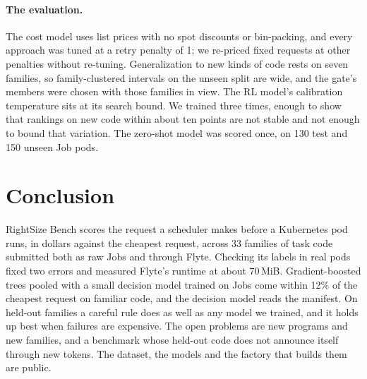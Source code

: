 \paragraph{The evaluation.}
The cost model uses list prices with no spot discounts or bin-packing, and every approach was tuned at a retry penalty
of 1; we re-priced fixed requests at other penalties without re-tuning. Generalization to new kinds of code rests on
seven families, so family-clustered intervals on the unseen split are wide, and the gate's members were chosen with
those families in view. The RL model's calibration temperature sits at its search bound. We trained three times,
enough to show that rankings on new code within about ten points are not stable and not enough to bound that
variation. The zero-shot model was scored once, on 130 test and 150 unseen Job pods.

\section{Conclusion}
\label{sec:conclusion}

RightSize Bench scores the request a scheduler makes before a Kubernetes pod runs, in dollars against the cheapest
request, across 33 families of task code submitted both as raw Jobs and through Flyte. Checking its labels in real
pods fixed two errors and measured Flyte's runtime at about 70\,MiB. Gradient-boosted trees pooled with a small decision
model trained on Jobs come within 12\% of the cheapest request on familiar code, and the decision model reads the
manifest. On held-out families a careful rule does as well as any model we trained, and it holds up best when
failures are expensive. The open problems are new programs and new families, and a benchmark whose held-out code
does not announce itself through new tokens. The dataset, the models and the factory that builds them are public.
